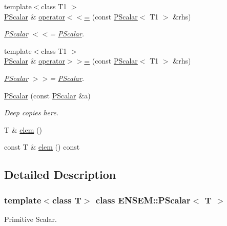 \begin{DoxyCompactItemize}
{\footnotesize template$<$class T1 $>$ }\\\mbox{\hyperlink{classENSEM_1_1PScalar}{P\+Scalar}} \& \mbox{\hyperlink{classENSEM_1_1PScalar_ade643675ab6ef041676e1098ac740b29}{operator$<$$<$=}} (const \mbox{\hyperlink{classENSEM_1_1PScalar}{P\+Scalar}}$<$ T1 $>$ \&rhs)
\begin{DoxyCompactList}\small\item\em \mbox{\hyperlink{classENSEM_1_1PScalar}{P\+Scalar}} $<$$<$= \mbox{\hyperlink{classENSEM_1_1PScalar}{P\+Scalar}}. \end{DoxyCompactList}\item 
{\footnotesize template$<$class T1 $>$ }\\\mbox{\hyperlink{classENSEM_1_1PScalar}{P\+Scalar}} \& \mbox{\hyperlink{classENSEM_1_1PScalar_a8fe07cd0462ddff9e3d0858ebe29e77c}{operator$>$$>$=}} (const \mbox{\hyperlink{classENSEM_1_1PScalar}{P\+Scalar}}$<$ T1 $>$ \&rhs)
\begin{DoxyCompactList}\small\item\em \mbox{\hyperlink{classENSEM_1_1PScalar}{P\+Scalar}} $>$$>$= \mbox{\hyperlink{classENSEM_1_1PScalar}{P\+Scalar}}. \end{DoxyCompactList}\item 
\mbox{\hyperlink{classENSEM_1_1PScalar_a2bf292f92c6654475bf2bc93c48adcd1}{P\+Scalar}} (const \mbox{\hyperlink{classENSEM_1_1PScalar}{P\+Scalar}} \&a)
\begin{DoxyCompactList}\small\item\em Deep copies here. \end{DoxyCompactList}\item 
T \& \mbox{\hyperlink{classENSEM_1_1PScalar_aac65f47beae4fa376f101587344c1589}{elem}} ()
\item 
const T \& \mbox{\hyperlink{classENSEM_1_1PScalar_ac20d84af6de415de7ad63292ad278542}{elem}} () const
\end{DoxyCompactItemize}


\subsection{Detailed Description}
\subsubsection*{template$<$class T$>$\newline
class E\+N\+S\+E\+M\+::\+P\+Scalar$<$ T $>$}

Primitive Scalar. 

